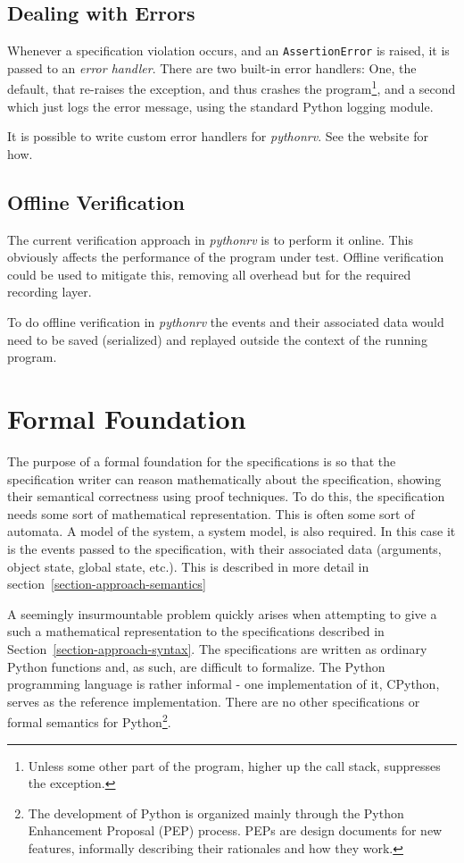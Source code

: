\documentclass[a4paper,11pt]{kth-mag}
\begin{document}
\subsection{Dealing with Errors}

Whenever a specification violation occurs, and an \texttt{AssertionError} is
raised, it is passed to an \textit{error handler}. There are two built-in error
handlers: One, the default, that re-raises the exception, and thus crashes the
program\footnote{Unless some other part of the program, higher up the call
stack, suppresses the exception.}, and a second which just logs the error
message, using the standard Python logging module.

It is possible to write custom error handlers for \textit{pythonrv}. See the
website for how.


\subsection{Offline Verification}

The current verification approach in \textit{pythonrv} is to perform it online.
This obviously affects the performance of the program under test. Offline
verification could be used to mitigate this, removing all overhead but for the
required recording layer.

To do offline verification in \textit{pythonrv} the events and their associated
data would need to be saved (serialized) and replayed outside the context of
the running program.



\section{Formal Foundation} \label{section-approach-formal-foundation}

The purpose of a formal foundation for the specifications is so that the
specification writer can reason mathematically about the specification, showing
their semantical correctness using proof techniques. To do this, the
specification needs some sort of mathematical representation. This is often
some sort of automata. A model of the system, a system model, is also required.
In this case it is the events passed to the specification, with their
associated data (arguments, object state, global state, etc.). This is
described in more detail in section~\ref{section-approach-semantics}

A seemingly insurmountable problem quickly arises when attempting to give a
such a mathematical representation to the specifications described in
Section~\ref{section-approach-syntax}. The specifications are written as
ordinary Python functions and, as such, are difficult to formalize. The Python
programming language is rather informal - one implementation of it, CPython,
serves as the reference implementation. There are no other specifications or
formal semantics for Python\footnote{The development of Python is organized
  mainly through the Python Enhancement Proposal (PEP) process. PEPs are design
documents for new features, informally describing their rationales and how they
work.}.
\end{document}
